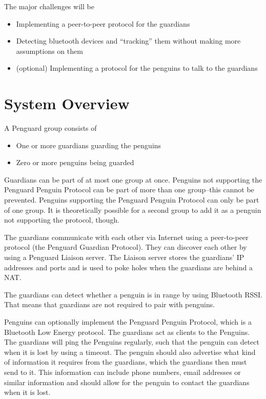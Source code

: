 \documentclass{report}
\begin{document}
The major challenges will be

\begin{itemize}
    \item Implementing a peer-to-peer protocol for the guardians
    \item Detecting bluetooth devices and ``tracking'' them without making more assumptions on them
    \item (optional) Implementing a protocol for the penguins to talk to the guardians
\end{itemize}

\section{System Overview}

A Penguard group consists of

\begin{itemize}
    \item One or more guardians guarding the penguins
    \item Zero or more penguins being guarded
\end{itemize}

Guardians can be part of at most one group at once. Penguins not supporting the Penguard Penguin Protocol can be part of more than one group--this cannot be prevented. Penguins supporting the Penguard Penguin Protocol can only be part of one group. It is theoretically possible for a second group to add it as a penguin not supporting the protocol, though.

The guardians communicate with each other via Internet using a peer-to-peer protocol (the Penguard Guardian Protocol). They can discover each other by using a Penguard Liaison server. The Liaison server stores the guardians' IP addresses and ports and is used to poke holes when the guardians are behind a NAT.

The guardians can detect whether a penguin is in range by using Bluetooth RSSI. That means that guardians are not required to pair with penguins.

Penguins can optionally implement the Penguard Penguin Protocol, which is a Bluetooth Low Energy protocol. The guardians act as clients to the Penguins. The guardians will ping the Penguins regularly, such that the penguin can detect when it is lost by using a timeout. The penguin should also advertise what kind of information it requires from the guardians, which the guardians then must send to it. This information can include phone numbers, email addresses or similar information and should allow for the penguin to contact the guardians when it is lost.
\end{document}
